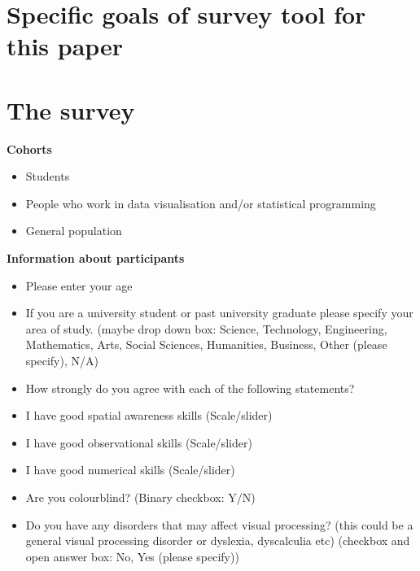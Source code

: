 \section{Specific goals of survey tool for this paper}


\section{The survey}

\textbf{Cohorts}
\begin{itemize}
    \item Students
    \item People who work in data visualisation and/or statistical programming
    \item General population
\end{itemize}



\textbf{Information about participants}


\begin{itemize}
    \item Please enter your age
    
    \item If you are a university student or past university graduate please specify your area of study. (maybe drop down box: Science, Technology, Engineering, Mathematics, Arts, Social Sciences, Humanities, Business, Other (please specify), N/A)

    \item How strongly do you agree with each of the following statements?

    \item I have good spatial awareness skills (Scale/slider)
    
    \item I have good observational skills (Scale/slider)
    
    \item I have good numerical skills (Scale/slider)
    
    \item Are you colourblind? (Binary checkbox: Y/N)
    
    \item Do you have any disorders that may affect visual processing? (this could be a general visual processing disorder 
    or dyslexia, dyscalculia etc)
    (checkbox and open answer box: No, Yes (please specify))
\end{itemize}



